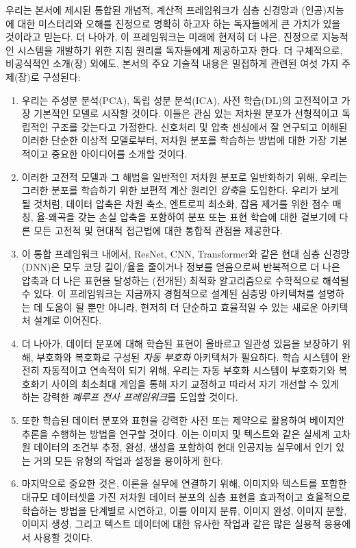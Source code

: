 \documentclass[../../book-main_ko.tex]{subfiles}
\begin{document}
우리는 본서에 제시된 통합된 개념적, 계산적 프레임워크가 심층 신경망과 (인공)지능에 대한 미스터리와 오해를 진정으로 명확히 하고자 하는 독자들에게 큰 가치가 있을 것이라고 믿는다. 더 나아가, 이 프레임워크는 미래에 현저히 더 나은, 진정으로 지능적인 시스템을 개발하기 위한 지침 원리를 독자들에게 제공하고자 한다. 더 구체적으로, 비공식적인 소개(장) 외에도, 본서의 주요 기술적 내용은 밀접하게 관련된 여섯 가지 주제(장)로 구성된다:
\begin{enumerate}
\item 우리는 주성분 분석(PCA), 독립 성분 분석(ICA), 사전 학습(DL)의 고전적이고 가장 기본적인 모델로 시작할 것이다. 이들은 관심 있는 저차원 분포가 선형적이고 독립적인 구조를 갖는다고 가정한다. 신호처리 및 압축 센싱에서 잘 연구되고 이해된 이러한 단순한 이상적 모델로부터, 저차원 분포를 학습하는 방법에 대한 가장 기본적이고 중요한 아이디어를 소개할 것이다.

\item 이러한 고전적 모델과 그 해법을 일반적인 저차원 분포로 일반화하기 위해, 우리는 그러한 분포를 학습하기 위한 보편적 계산 원리인 {\em 압축}을 도입한다. 우리가 보게 될 것처럼, 데이터 압축은 차원 축소, 엔트로피 최소화, 잡음 제거를 위한 점수 매칭, 율-왜곡을 갖는 손실 압축을 포함하여 분포 또는 표현 학습에 대한 겉보기에 다른 모든 고전적 및 현대적 접근법에 대한 통합적 관점을 제공한다.

\item 이 통합 프레임워크 내에서, ResNet, CNN, Transformer와 같은 현대 심층 신경망(DNN)은 모두 코딩 길이/율을 줄이거나 정보를 얻음으로써 반복적으로 더 나은 압축과 더 나은 표현을 달성하는 (전개된) 최적화 알고리즘으로 수학적으로 해석될 수 있다. 이 프레임워크는 지금까지 경험적으로 설계된 심층망 아키텍처를 설명하는 데 도움이 될 뿐만 아니라, 현저히 더 단순하고 효율적일 수 있는 새로운 아키텍처 설계로 이어진다.

\item 더 나아가, 데이터 분포에 대해 학습된 표현이 올바르고 일관성 있음을 보장하기 위해, 부호화와 복호화로 구성된 {\em 자동 부호화} 아키텍처가 필요하다. 학습 시스템이 완전히 자동적이고 연속적이 되기 위해, 우리는 자동 부호화 시스템이 부호화기와 복호화기 사이의 최소최대 게임을 통해 자기 교정하고 따라서 자기 개선할 수 있게 하는 강력한 {\em 폐루프 전사 프레임워크}를 도입할 것이다.

\item 또한 학습된 데이터 분포와 표현을 강력한 사전 또는 제약으로 활용하여 베이지안 추론을 수행하는 방법을 연구할 것이다. 이는 이미지 및 텍스트와 같은 실세계 고차원 데이터의 조건부 추정, 완성, 생성을 포함하여 현대 인공지능 실무에서 인기 있는 거의 모든 유형의 작업과 설정을 용이하게 한다.

\item 마지막으로 중요한 것은, 이론을 실무에 연결하기 위해, 이미지와 텍스트를 포함한 대규모 데이터셋을 가진 저차원 데이터 분포의 심층 표현을 효과적이고 효율적으로 학습하는 방법을 단계별로 시연하고, 이를 이미지 분류, 이미지 완성, 이미지 분할, 이미지 생성, 그리고 텍스트 데이터에 대한 유사한 작업과 같은 많은 실용적 응용에서 사용할 것이다.
\end{enumerate}
\end{document}
